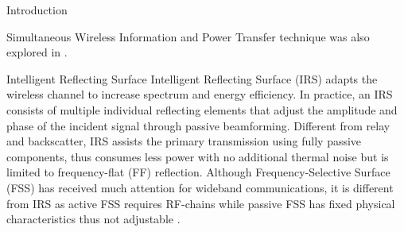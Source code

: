 \documentclass[journal]{IEEEtran}
\begin{document}
\begin{section}{Introduction}
\begin{subsection}{Simultaneous Wireless Information and Power Transfer}
technique was also explored in \cite{Mao2019}.
		\end{subsection}


		\begin{subsection}{Intelligent Reflecting Surface}
			Intelligent Reflecting Surface (IRS) adapts the wireless channel to increase spectrum and energy efficiency. In practice, an IRS consists of multiple individual reflecting elements that adjust the amplitude and phase of the incident signal through passive beamforming. Different from relay and backscatter, IRS assists the primary transmission using fully passive components, thus consumes less power with no additional thermal noise but is limited to frequency-flat (FF) reflection. Although Frequency-Selective Surface (FSS) has received much attention for wideband communications, it is different from IRS as active FSS requires RF-chains \cite{Kim2006,Xu2014} while passive FSS has fixed physical characteristics thus not adjustable \cite{Anwar2018}.


\end{subsection}
\end{section}
\end{document}

